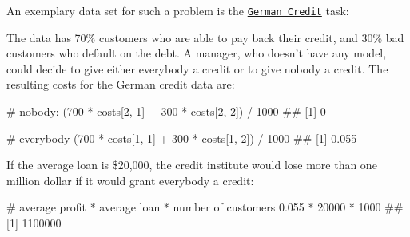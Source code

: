 \documentclass[]{article}
\newenvironment{Shaded}{}{}
\newcommand{\CommentTok}[1]{\textcolor[rgb]{0.00,0.50,0.00}{#1}}
\newcommand{\DecValTok}[1]{#1}
\newcommand{\FloatTok}[1]{#1}
\newcommand{\KeywordTok}[1]{\textcolor[rgb]{0.00,0.00,1.00}{#1}}
\newcommand{\NormalTok}[1]{#1}
\newcommand{\OperatorTok}[1]{#1}
\newcommand{\StringTok}[1]{\textcolor[rgb]{0.00,0.50,0.50}{#1}}
\renewenvironment{Shaded} {\begin{snugshade}\small} {\end{snugshade}}
\begin{document}
An exemplary data set for such a problem is the \href{https://mlr3.mlr-org.com/reference/mlr_tasks_german_credit.html}{\texttt{German\ Credit}} task:

\begin{Shaded}
\end{Shaded}

The data has 70\% customers who are able to pay back their credit, and 30\% bad customers who default on the debt.
A manager, who doesn't have any model, could decide to give either everybody a credit or to give nobody a credit.
The resulting costs for the German credit data are:

\begin{Shaded}
\begin{Highlighting}[]
\CommentTok{# nobody:}
\NormalTok{(}\DecValTok{700} \OperatorTok{*}\StringTok{ }\NormalTok{costs[}\DecValTok{2}\NormalTok{, }\DecValTok{1}\NormalTok{] }\OperatorTok{+}\StringTok{ }\DecValTok{300} \OperatorTok{*}\StringTok{ }\NormalTok{costs[}\DecValTok{2}\NormalTok{, }\DecValTok{2}\NormalTok{]) }\OperatorTok{/}\StringTok{ }\DecValTok{1000}
\NormalTok{## [1] 0}

\CommentTok{# everybody}
\NormalTok{(}\DecValTok{700} \OperatorTok{*}\StringTok{ }\NormalTok{costs[}\DecValTok{1}\NormalTok{, }\DecValTok{1}\NormalTok{] }\OperatorTok{+}\StringTok{ }\DecValTok{300} \OperatorTok{*}\StringTok{ }\NormalTok{costs[}\DecValTok{1}\NormalTok{, }\DecValTok{2}\NormalTok{]) }\OperatorTok{/}\StringTok{ }\DecValTok{1000}
\NormalTok{## [1] 0.055}
\end{Highlighting}
\end{Shaded}

If the average loan is \$20,000, the credit institute would lose more than one million dollar if it would grant everybody a credit:

\begin{Shaded}
\begin{Highlighting}[]
\CommentTok{# average profit * average loan * number of customers}
\FloatTok{0.055} \OperatorTok{*}\StringTok{ }\DecValTok{20000} \OperatorTok{*}\StringTok{ }\DecValTok{1000}
\NormalTok{## [1] 1100000}
\end{Highlighting}
\end{Shaded}
\end{document}
